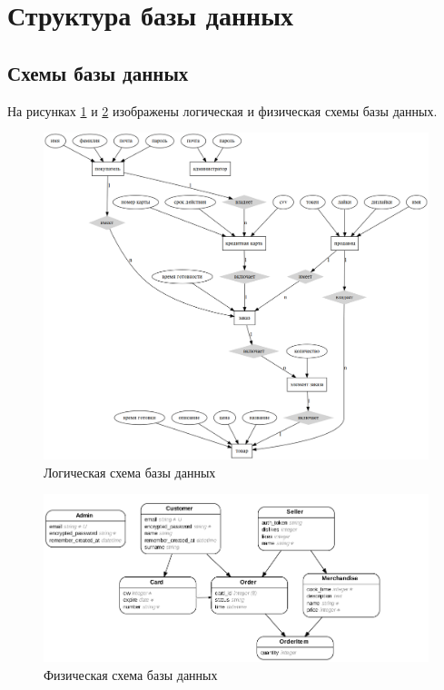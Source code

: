 \newpage

\section{Структура базы данных}
{
    \subsection{Схемы базы данных}
    На рисунках \ref{logic_db} и \ref{physical_db} изображены логическая и физическая схемы базы данных.
    \begin{figure}[H]
    \centering
    	\includegraphics[width=\textwidth]{ER.png}
    	\caption{Логическая схема базы данных}
    	\label{logic_db}
    \end{figure}

    \begin{figure}[H]
    \centering
    	\includegraphics[width=\textwidth]{erd.png}
    	\caption{Физическая схема базы данных}
    	\label{physical_db}
    \end{figure}

}
